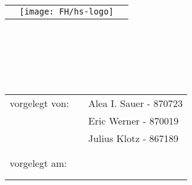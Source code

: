 \thispagestyle{empty}
\begin{tabular}{lcr}
  \hspace{0.8cm} &
  \texttt{[image: FH/hs-logo]} & %
  \hspace{0.8cm}
  \\
\end{tabular}
\ \vspace{1.5cm}\\
\begin{flushleft}

	\textbf{\huge\trtype}\vspace{1.5cm}\\
	\textbf{\large \trtitleDE}\vspace{1.5cm}\\
	\textbf{\normalsize \trtitleENG}\vspace{1.5cm}\\

	\begin{tabular}{lll}
		vorgelegt von: & & Alea I. Sauer - 870723\\
		& & Eric Werner - 870019\\
		& & Julius Klotz - 867189\\ \\\\
		vorgelegt am: & & \trdate\\ \\\\
		\end{tabular}
\end{flushleft}